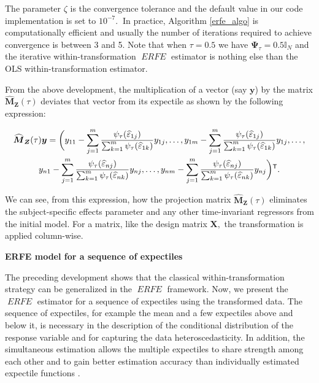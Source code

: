 \documentclass[15pt,a4paper]{article}
\newcommand{\transpose}{{}^{\text{\sffamily T}}}
\DeclareMathOperator{\ERFE}{\textit{ERFE}}
\begin{document}
The parameter $\zeta$ is the convergence tolerance and the default value in our code implementation is set to $10^{-7}. \ $ In practice, Algorithm \ref{erfe_algo} is computationally efficient and usually the number of iterations required to achieve convergence is between 3 and 5. Note that when \(\tau=0.5\) we have \(\boldsymbol{\Psi}_{\tau}=0.5\mathbb{I}_{N}\) and the iterative within-transformation $\ERFE$ estimator is nothing else than the OLS within-transformation estimator.

From the above development, the multiplication of a vector (say \(\boldsymbol{y}\)) by the matrix \(\widehat{\boldsymbol{M}}_{\boldsymbol{Z}}(\tau)\) deviates that vector from its expectile as shown by the following expression:

\begin{multline*}
    \widehat{\boldsymbol{M}}_{\boldsymbol{Z}}(\tau)\boldsymbol{y}=\bigg(
      y_{11}-\sum_{j=1}^{m}\frac{\psi_{\tau}(\widehat{\varepsilon}_{1j})}{\sum_{k=1}^{m}\psi_{\tau}(\widehat{\varepsilon}_{1k})}y_{1j}, \ldots,
      y_{1m}-\sum_{j=1}^{m}\frac{\psi_{\tau}(\widehat{\varepsilon}_{1j})}{\sum_{k=1}^{m}\psi_{\tau}(\widehat{\varepsilon}_{1k})}y_{1j}, \ldots,\\
      y_{n1}-\sum_{j=1}^{m}\frac{\psi_{\tau}(\widehat{\varepsilon}_{nj})}{\sum_{k=1}^{m}\psi_{\tau}(\widehat{\varepsilon}_{nk})}y_{nj}, \ldots, y_{nm}-\sum_{j=1}^{m}\frac{\psi_{\tau}(\widehat{\varepsilon}_{nj})}{\sum_{k=1}^{m}\psi_{\tau}(\widehat{\varepsilon}_{nk})}y_{nj}\bigg)\transpose.
\end{multline*}

We can see, from this expression, how the projection matrix \(\widehat{\boldsymbol{M}}_{\boldsymbol{Z}}(\tau)\) eliminates the subject-specific effects parameter and any other time-invariant regressors from the initial model. For a matrix, like the design matrix \(\boldsymbol{X},\) the transformation is applied column-wise.

\textbf{ERFE model for a sequence of expectiles }

The preceding development shows that the classical within-transformation strategy can be generalized in the $\ERFE$ framework. Now, we present the $\ERFE$ estimator for a sequence of expectiles using the transformed data. The sequence of expectiles, for example the mean and a few expectiles above and below it, is necessary in the description of the conditional distribution of the response variable and for capturing the data heteroscedasticity. In addition, the simultaneous estimation allows the multiple expectiles to share strength among each other and to gain better estimation accuracy than individually estimated expectile functions \citep{LiuWu2011}.
\end{document}
